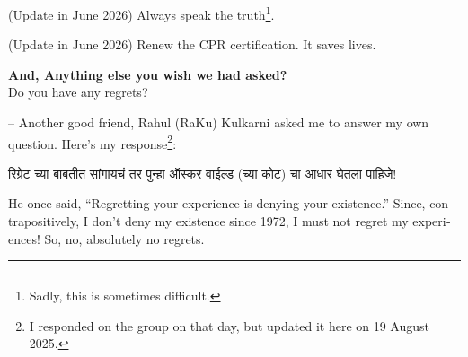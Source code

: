 \documentclass[17pt]{extarticle}  %
\begin{document}
\begin{enumerate}
\begin{english}
  (Update in June 2026) Always speak the truth\footnote{Sadly, this is sometimes difficult.}.

  (Update in June 2026) Renew the CPR certification. It saves lives.

\item\textbf{And, Anything else you wish we had asked?}\\

Do you have any regrets?

-- Another good friend, Rahul (RaKu) Kulkarni asked me to answer my own question. Here's my response\footnote{I responded on the group on that day, but updated it here on 19 August 2025.}: 

\begin{marathi}रिग्रेट च्या बाबतीत सांगायचं तर पुन्हा ऑस्कर वाईल्ड (च्या कोट) चा आधार घेतला पाहिजे!\end{marathi} He once said, ``Regretting your experience is denying your existence.'' Since, contrapositively, I don't deny my existence since 1972, I must not regret my experiences! So, no, absolutely no regrets.
\end{english}
\end{enumerate}
\vspace{5mm}

\hrule
\end{document}
